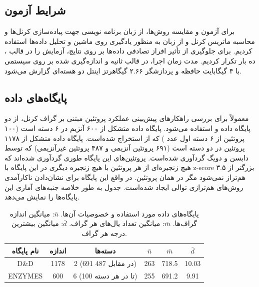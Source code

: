 \subsection{شرایط آزمون}
برای آزمون و مقایسه روش‌ها، از زبان برنامه نویسی  جهت پیاده‌سازی کرنل‌ها و محاسبه ماتریس کرنل و از زبان  به منظور یادگیری روی ماشین  و تحلیل داده‌ها استفاده کردیم. برای جلوگیری از تأثیر افراز تصادفی داده‌ها بر روی نتایج، آزمایش را در قالب ، ده بار تکرار کردیم. مدت زمان اجرا، در قالب ثانیه و اندازه‌گیری شده بر روی سیستمی با ۴ گیگابایت حافظه و پردازشگر ۲.۶۶ گیگاهرتز اینتل دو هسته‌ای گزارش می‌شود.

\subsection{پایگاه‌های داده}
معمولاً برای بررسی راهکارهای پیش‌بینی عملکرد پروتئین مبتنی بر گراف کرنل، از دو پایگاه داده  و  استفاده می‌شود.  پایگاه داده متشکل از ۶۰۰ آنزیم در ۶ دسته است (۱۰۰ پروتئین از ۶ دسته اول عدد ) که از  استخراج شده‌است.  پایگاه داده متشکل از ۱۱۷۸ پروتئین در دو دسته است (۶۹۱ پروتئین آنزیمی و ۴۸۷ پروتئین غیرآنزیمی) که توسط دابسن و دویگ گردآوری شده‌است. پروتئین‌های این پایگاه طوری گردآوری شده‌اند که هیچ زنجیره‌ای از هر پروتئین با هیچ زنجیره دیگری در این پایگاه با z-score بزرگتر از ۳.۵ هم‌تراز نمی‌شود مگر در همان پروتئین. در واقع این پایگاه برای نشان‌دادن ناکارآمدی روش‌های هم‌ترازی توالی ایجاد شده‌است. جدول  به طور خلاصه جنبه‌های آماری این پایگاه‌ها را نمایش می‌دهد.

\begin{table}[ht]
\centering
\begin{tabular}{| c | c | c | c | c | c |}
    \hline
    نام پایگاه & اندازه & دسته‌ها & $\bar{n}$ & $\bar{m}$ & $\bar{d}$\\[5pt] \hline
    D\&D & 1178 & 2 (691 در مقابل 487) & 263 & 718.5 & 10.03 \\ \hline
    ENZYMES & 600 & 6 (100 تا در هر دسته) & 255 & 691.2 & 9.91 \\ \hline
\end{tabular}
\caption{
    پایگاه‌های داده مورد استفاده و خصوصیات آن‌ها.
 $\bar{n}$: میانگین اندازه گراف‌ها. $\bar{m}$: میانگین تعداد یال‌های هر گراف.  $\bar{d}$: میانگین بیشترین درجه هر گراف.
}
\label{tab:dataset-statistics}
\end{table}

